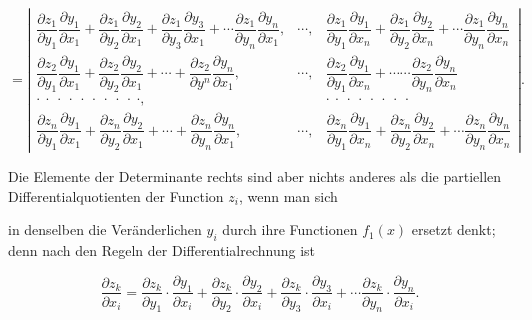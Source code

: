 \documentclass[11pt]{article}
\providecommand{\weberpage}[1]{}
\providecommand{\weq}[2]{\begin{equation}\tag{#1}#2\end{equation}}
\begin{document}
\[
=
\left|
\begin{array}{lll}
\dfrac{\partial z_1}{\partial y_1}\dfrac{\partial y_1}{\partial x_1}+\dfrac{\partial z_1}{\partial y_2}\dfrac{\partial y_2}{\partial x_1}+\dfrac{\partial z_1}{\partial y_3}\dfrac{\partial y_3}{\partial x_1}+\cdots\dfrac{\partial z_1}{\partial y_n}\dfrac{\partial y_n}{\partial x_1}, & \cdots, & \dfrac{\partial z_1}{\partial y_1}\dfrac{\partial y_1}{\partial x_n}+\dfrac{\partial z_1}{\partial y_2}\dfrac{\partial y_2}{\partial x_n}+\cdots\dfrac{\partial z_1}{\partial y_n}\dfrac{\partial y_n}{\partial x_n} \\[2ex]
\dfrac{\partial z_2}{\partial y_1}\dfrac{\partial y_1}{\partial x_1}+\dfrac{\partial z_2}{\partial y_2}\dfrac{\partial y_2}{\partial x_1}+\cdots+\dfrac{\partial z_2}{\partial y^n}\dfrac{\partial y_n}{\partial x_1}, & \cdots, & \dfrac{\partial z_2}{\partial y_1}\dfrac{\partial y_1}{\partial x_n}+\cdots\cdots\dfrac{\partial z_2}{\partial y_n}\dfrac{\partial y_n}{\partial x_n} \\[2ex]
\cdot\ \cdot\ \cdot\ \cdot\ \cdot\ \cdot\ \cdot\ \cdot\ \cdot\ \cdot, & & \cdot\ \cdot\ \cdot\ \cdot\ \cdot\ \cdot\ \cdot\ \cdot \\[2ex]
\dfrac{\partial z_n}{\partial y_1}\dfrac{\partial y_1}{\partial x_1}+\dfrac{\partial z_n}{\partial y_2}\dfrac{\partial y_2}{\partial x_1}+\cdots+\dfrac{\partial z_n}{\partial y_n}\dfrac{\partial y_n}{\partial x_1}, & \cdots, & \dfrac{\partial z_n}{\partial y_1}\dfrac{\partial y_1}{\partial x_n}+\dfrac{\partial z_n}{\partial y_2}\dfrac{\partial y_2}{\partial x_n}+\cdots\dfrac{\partial z_n}{\partial y_n}\dfrac{\partial y_n}{\partial x_n}
\end{array}
\right|.
\]

Die Elemente der Determinante rechts sind aber nichts anderes als
die partiellen Differentialquotienten der Function $z_i$, wenn man sich


\weberpage{124}
in denselben die Veränderlichen $y_i$ durch ihre Functionen $f_1(x)$ ersetzt
denkt; denn nach den Regeln der Differentialrechnung ist

\weq{2}{
\dfrac{\partial z_k}{\partial x_i} = \dfrac{\partial z_k}{\partial y_1}\cdot\dfrac{\partial y_1}{\partial x_i} + \dfrac{\partial z_k}{\partial y_2}\cdot\dfrac{\partial y_2}{\partial x_i} + \dfrac{\partial z_k}{\partial y_3}\cdot\dfrac{\partial y_3}{\partial x_i} + \cdots \dfrac{\partial z_k}{\partial y_n}\cdot\dfrac{\partial y_n}{\partial x_i}.
}
\end{document}
